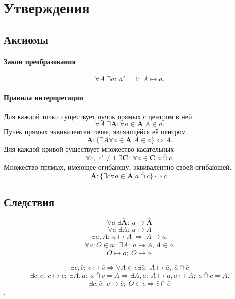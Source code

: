 \section{Утверждения}

\subsection{Аксиомы}
\paragraph{Закон преобразования}
$$\forall A \; \exists \bar a:\: \bar a' =1;\; A \mapsto \bar a.$$

\paragraph{Правила интерпретации}
Для каждой точки существует пучок прямых с центром в ней.
$$\forall A \; \exists \mathbf{A}: \forall a \in \mathbf{A} \; A \in a.$$
Пучёк прямых эквивалентен точке, являющейся её центром.
$$\mathbf{A}:\{ \exists A \forall a \in \mathbf{A} \; A \in a \} \Leftrightarrow A.$$
Для каждой кривой существует множество касательных
$$\forall c,\; c'\ne 1 \; \exists \mathbf{C} :\: \forall a \in \mathbf{C} \; a \overline\cap c.$$
Множество прямых, имеющее огибающу, эквивалентно своей огибающей.
$$\mathbf{A}:\{\exists c \forall a \in \mathbf{A} \; a \overline\cap c\} \Leftrightarrow c.$$

\subsection{Следствия}
$$\forall a \; \exists \mathbf{\bar A} :\: a \mapsto \mathbf{\bar A}$$
$$\forall a \; \exists \bar A: \: a \mapsto \bar A$$
$$\exists a,\bar A: \: a \mapsto \bar A \: \Rightarrow \; \bar A \mapsto a.$$
$$\forall a: O \in a; \; \exists \bar A :\: a \mapsto \bar A, \bar A \in \bar o.$$
$$O \mapsto \bar o;\; \bar O \mapsto o.$$

$$\exists c, \bar c:\: c \mapsto \bar c \Rightarrow \forall A \in c \exists \bar a:\: A \mapsto \bar a,\; \bar a \overline\cap \bar c$$
$$\exists c, \bar c:\: c \mapsto \bar c;\; \exists A, a:\: a \overline\cap c = A \Rightarrow \exists \bar A, \bar a:\: A\mapsto \bar a, a \mapsto \bar A;\; \bar a \overline\cap \bar c = \bar A.$$
$$\exists c, \bar c:\: c \mapsto \bar c;\; O \in c \Rightarrow \bar c \overline\cap \bar o$$.
